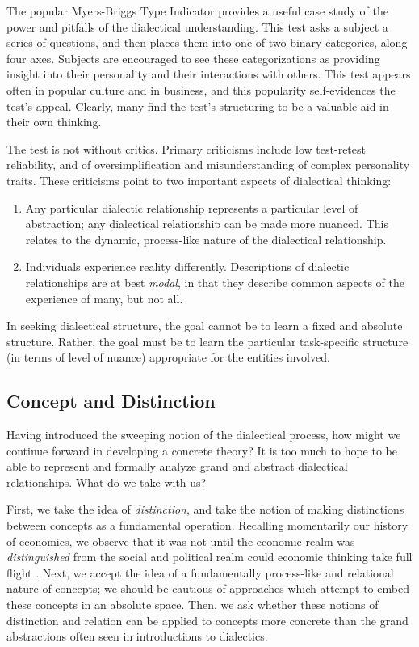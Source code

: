 \documentclass[12pt]{book}
\begin{document}
The popular Myers-Briggs Type Indicator provides a useful case study of the power and pitfalls of the dialectical understanding.
This test asks a subject a series of questions, and then places them into one of two binary categories, along four axes.
Subjects are encouraged to see these categorizations as providing insight into their personality and their interactions with others.
This test appears often in popular culture and in business, and this popularity self-evidences the test's appeal.
Clearly, many find the test's structuring to be a valuable aid in their own thinking.

The test is not without critics.
Primary criticisms include low test-retest reliability, and of oversimplification and misunderstanding of complex personality traits.
These criticisms point to two important aspects of dialectical thinking:

\begin{enumerate}
	\item Any particular dialectic relationship represents a particular level of abstraction; any dialectical relationship can be made more nuanced. This relates to the dynamic, process-like nature of the dialectical relationship.
	\item Individuals experience reality differently. Descriptions of dialectic relationships are at best \textit{modal}, in that they describe common aspects of the experience of many, but not all.
\end{enumerate}

In seeking dialectical structure, the goal cannot be to learn a fixed and absolute structure. Rather, the goal must be to learn the particular task-specific structure (in terms of level of nuance) appropriate for the entities involved.


\subsection{Concept and Distinction}

Having introduced the sweeping notion of the dialectical process, how might we continue forward in developing a concrete theory?
It is too much to hope to be able to represent and formally analyze grand and abstract dialectical relationships.
What do we take with us?

First, we take the idea of \textit{distinction}, and take the notion of making distinctions between concepts as a fundamental operation.
Recalling momentarily our history of economics, we observe that it was not until the economic realm was \textit{distinguished} from the social and political realm could economic thinking take full flight \cite{heilbroner}.
Next, we accept the idea of a fundamentally process-like and relational nature of concepts; we should be cautious of approaches which attempt to embed these concepts in an absolute space.
Then, we ask whether these notions of distinction and relation can be applied to concepts more concrete than the grand abstractions often seen in introductions to dialectics.
\end{document}
